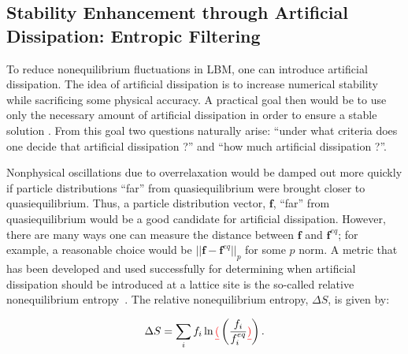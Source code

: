 \subsection{Stability Enhancement through Artificial Dissipation: Entropic Filtering}

To reduce nonequilibrium fluctuations in LBM, one can introduce artificial dissipation.
The idea of artificial dissipation is to increase numerical stability while sacrificing some physical accuracy.
\DIFdelbegin {}\DIFdelend %
A practical goal then would be to use only the necessary amount of artificial dissipation in order to ensure a stable solution \DIFaddbegin {}\DIFaddend .
From this goal two questions naturally arise: ``under what criteria does one decide that artificial dissipation \DIFdelbegin {}\DIFdelend \DIFaddbegin {}\DIFaddend ?'' and ``how much artificial dissipation \DIFdelbegin {}\DIFdelend \DIFaddbegin {}\DIFaddend ?''.

Nonphysical oscillations due to overrelaxation would be damped out more quickly if particle distributions ``far'' from quasiequilibrium were brought closer to quasiequilibrium.
Thus, a particle distribution vector, $\mathbf{f}$, ``far'' from quasiequilibrium would be a good candidate for artificial dissipation.
However, there are many ways one can measure the distance between $\mathbf{f}$ and $\mathbf{f}^{eq}$; for example, a reasonable choice would be $||\mathbf{f} - \mathbf{f}^{eq}||_p$ for some $p$ norm.
A metric that has been developed and used successfully for determining when artificial dissipation should be introduced at a lattice site is the so-called relative nonequilibrium entropy~\cite{gorban2014enhancement,brownlee2006stabilization,brownlee2007stability,brownlee2008nonequilibrium,packwood2009entropy}.
The relative nonequilibrium entropy, $\Delta S$, is given by:

\begin{equation} \label{eq:rel-noneq-entropy}
\Delta S = \sum_i f_i \ln\DIFdelbegin \DIFdel{(}\DIFdelend \DIFaddbegin \left(\DIFaddend \frac{f_i}{f^{eq}_i}\DIFdelbegin \DIFdel{)}\DIFdelend \DIFaddbegin \right)\DIFaddend .
\end{equation}

